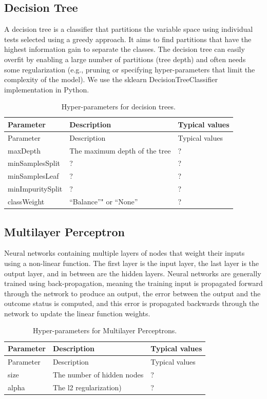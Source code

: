 \documentclass[11pt]{book}
\theoremstyle{definition}
\theoremstyle{definition}
\theoremstyle{definition}
\theoremstyle{remark}
\begin{document}
\hypertarget{decision-tree}{%
\subsection{Decision Tree}\label{decision-tree}}

A decision tree is a classifier that partitions the variable space using individual tests selected using a greedy approach. It aims to find partitions that have the highest information gain to separate the classes. The decision tree can easily overfit by enabling a large number of partitions (tree depth) and often needs some regularization (e.g., pruning or specifying hyper-parameters that limit the complexity of the model). We use the sklearn DecisionTreeClassifier implementation in Python.  

\begin{longtable}[]{@{}lll@{}}
\caption{\label{tab:decisionTreeParameters} Hyper-parameters for decision trees.}\tabularnewline
\toprule
Parameter & Description & Typical values\tabularnewline
\midrule
\endfirsthead
\toprule
Parameter & Description & Typical values\tabularnewline
\midrule
\endhead
maxDepth & The maximum depth of the tree & ?\tabularnewline
minSamplesSplit & ? & ?\tabularnewline
minSamplesLeaf & ? & ?\tabularnewline
minImpuritySplit & ? & ?\tabularnewline
classWeight & ``Balance''" or ``None'' & ?\tabularnewline
\bottomrule
\end{longtable}

\hypertarget{multilayer-perceptron}{%
\subsection{Multilayer Perceptron}\label{multilayer-perceptron}}

Neural networks containing multiple layers of nodes that weight their inputs using a non-linear function. The first layer is the input layer, the last layer is the output layer, and in between are the hidden layers. Neural networks are generally trained using back-propagation, meaning the training input is propagated forward through the network to produce an output, the error between the output and the outcome status is computed, and this error is propagated backwards through the network to update the linear function weights.   

\begin{longtable}[]{@{}lll@{}}
\caption{\label{tab:mpParameters} Hyper-parameters for Multilayer Perceptrons.}\tabularnewline
\toprule
Parameter & Description & Typical values\tabularnewline
\midrule
\endfirsthead
\toprule
Parameter & Description & Typical values\tabularnewline
\midrule
\endhead
size & The number of hidden nodes & ?\tabularnewline
alpha & The l2 regularization) & ?\tabularnewline
\bottomrule
\end{longtable}
\end{document}
